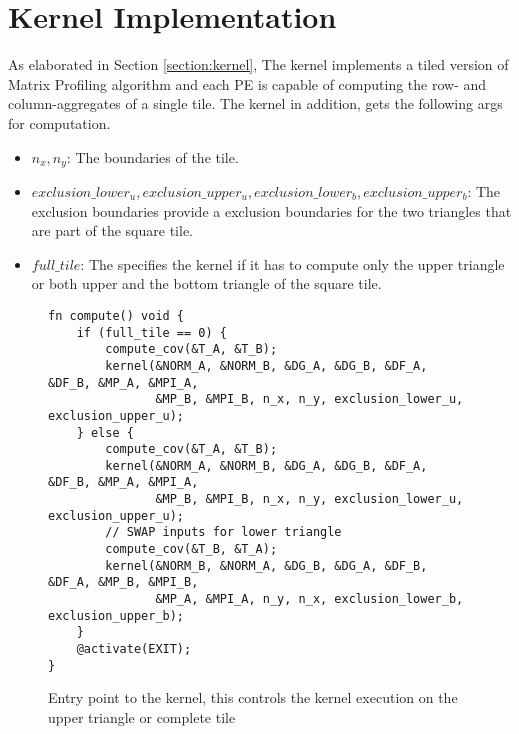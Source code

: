 \section{Kernel Implementation}

As elaborated in Section \ref{section:kernel}, The kernel implements a tiled version of Matrix Profiling algorithm and each PE is capable of computing the row- and column-aggregates of a single tile. The kernel in addition, gets the following args for computation.
\begin{itemize}
    \item \(n_x, n_y\): The boundaries of the tile. 
    \item \(exclusion\_lower_u, exclusion\_upper_u, exclusion\_lower_b, exclusion\_upper_b\): The exclusion boundaries provide a exclusion boundaries for the two triangles that are part of the square tile.
    \item \(full\_tile\): The specifies the kernel if it has to compute only the upper triangle or both upper and the bottom triangle of the square tile.
\end{itemize}

\begin{figure}[!ht]
    \centering
    \begin{verbatim}
fn compute() void {      
    if (full_tile == 0) {
        compute_cov(&T_A, &T_B);
        kernel(&NORM_A, &NORM_B, &DG_A, &DG_B, &DF_A, &DF_B, &MP_A, &MPI_A,
               &MP_B, &MPI_B, n_x, n_y, exclusion_lower_u, exclusion_upper_u);
    } else {
        compute_cov(&T_A, &T_B);
        kernel(&NORM_A, &NORM_B, &DG_A, &DG_B, &DF_A, &DF_B, &MP_A, &MPI_A,
               &MP_B, &MPI_B, n_x, n_y, exclusion_lower_u, exclusion_upper_u);
        // SWAP inputs for lower triangle
        compute_cov(&T_B, &T_A);
        kernel(&NORM_B, &NORM_A, &DG_B, &DG_A, &DF_B, &DF_A, &MP_B, &MPI_B,
               &MP_A, &MPI_A, n_y, n_x, exclusion_lower_b, exclusion_upper_b);
    }
    @activate(EXIT);
}
\end{verbatim}
\caption{Entry point to the kernel, this controls the kernel execution on the upper triangle or complete tile}\label{code:entry_function}
\end{figure}


